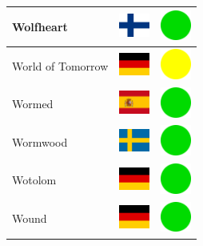 \documentclass[12pt, a4paper, twoside]{report}
\begin{document}
\begin{center}
\begin{longtable}{|p{5cm}|p{2cm}|p{2cm}|}
 Wolfheart                                                  & \includegraphics[width=1cm]{../img/flags/fi} &   \includegraphics[width=1cm]{../likes/y} \\ \hline
 World of Tomorrow                                          & \includegraphics[width=1cm]{../img/flags/de} &   \includegraphics[width=1cm]{../likes/m} \\ \hline
 Wormed                                                     & \includegraphics[width=1cm]{../img/flags/es} &   \includegraphics[width=1cm]{../likes/y} \\ \hline
 Wormwood                                                   & \includegraphics[width=1cm]{../img/flags/se} &   \includegraphics[width=1cm]{../likes/y} \\ \hline
 Wotolom                                                    & \includegraphics[width=1cm]{../img/flags/de} &   \includegraphics[width=1cm]{../likes/y} \\ \hline
 Wound                                                      & \includegraphics[width=1cm]{../img/flags/de} &   \includegraphics[width=1cm]{../likes/y} \\ \hline

\end{longtable}
\end{center}
\end{document}
